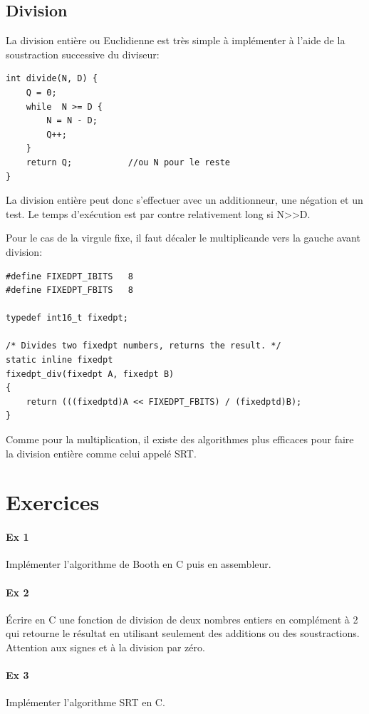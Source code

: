 \subsection{Division}
La division entière ou Euclidienne est très simple à implémenter à l'aide de la soustraction successive du diviseur:

\lstset{style=customc}
\begin{lstlisting}
int divide(N, D) {
	Q = 0;
	while  N >= D {
  		N = N - D;
  		Q++;
	}
	return Q;			//ou N pour le reste
}
\end{lstlisting}

La division entière peut donc s'effectuer avec un additionneur, une négation et un test. Le temps d'exécution est par contre relativement long si N>>D.

Pour le cas de la virgule fixe, il faut décaler le multiplicande vers la gauche avant division:

\lstset{style=customc}
\begin{lstlisting}
#define FIXEDPT_IBITS	8
#define FIXEDPT_FBITS	8

typedef int16_t fixedpt;

/* Divides two fixedpt numbers, returns the result. */
static inline fixedpt
fixedpt_div(fixedpt A, fixedpt B)
{
	return (((fixedptd)A << FIXEDPT_FBITS) / (fixedptd)B);
}
\end{lstlisting}

Comme pour la multiplication, il existe des algorithmes plus efficaces pour faire la division entière comme celui appelé SRT.

\section{Exercices}

\paragraph{Ex 1}
Implémenter l'algorithme de Booth en C puis en assembleur.

\paragraph{Ex 2}
Écrire en C une fonction de division de deux nombres entiers en complément à 2 qui retourne le résultat en utilisant seulement des additions ou des soustractions. Attention aux signes et à la division par zéro.

\paragraph{Ex 3}
Implémenter l'algorithme SRT en C.


